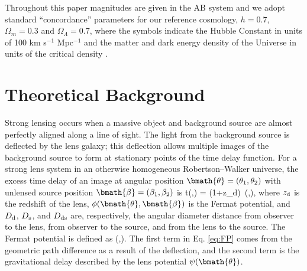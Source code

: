 \documentclass[useAMS,usenatbib]{mn2e}
\begin{document}
Throughout this paper magnitudes are given in the AB system \citep{Oke74} and
we adopt standard ``concordance'' parameters for our reference cosmology, \ie
$h=0.7$, $\Omega_m=0.3$ and $\Omega_\Lambda=0.7$, where the symbols indicate
the Hubble Constant in units of 100 km s$^{-1}$ Mpc$^{-1}$ and the matter and
dark energy density of the Universe in units of the critical density
\citep[e.g.\ ][]{Kom++09}.



\section{Theoretical Background}
\label{sec:theory}


Strong lensing occurs when a massive object and background source are almost perfectly
aligned along a line of sight. The light from the background source is deflected by the
lens galaxy; this deflection allows multiple images of the background source to form
at stationary points of the time delay function. For a strong lens system in an otherwise
homogeneous Robertson--Walker universe, the excess time delay of an image at angular position
$\bmath{\theta}=(\theta_1,\theta_2)$ with unlensed source position $\bmath{\beta}=(\beta_1,\beta_2)$ is
\be \label{eq:T} 
\Delta t(\bmath{\theta},\bmath{\beta}) =   (1+z_{\rm d})\, \phi(\bmath{\theta},\bmath{\beta}),
\ee
where $z_{\rm d}$ is the redshift of the lens, $\phi(\bmath{\theta},\bmath{\beta})$ is
the Fermat potential, and $D_{\rm d}$, $D_{\rm s}$, and $D_{\rm ds}$
are, respectively, the angular diameter distance from observer to the lens, from observer
to the source, and from the lens to the source. The Fermat potential is
defined as
\be \label{eq:FP}
\phi(\bmath{\theta},\bmath{\beta})\equiv {}. 
\ee
The first term in Eq. \ref{eq:FP} comes from the geometric path difference as a result of
the deflection, and the second term is the gravitational delay
described by the lens potential $\psi(\bmath{\theta})$.  
\end{document}
